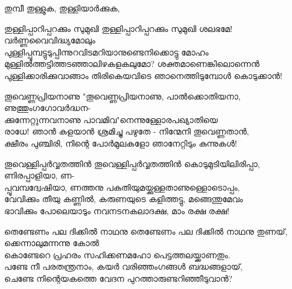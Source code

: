 \begin{enumerate}
\begin{slokam}{\VSv}{\KND}{തുമ്പീ തുള്ളുക, തുള്ളിയാർക്കുക,}
\end{slokam}


\begin{slokam}{\VSr}{\HM}{തുള്ളിപ്പാറിപ്പറക്കും സുമുഖി}
തുള്ളിപ്പാറിപ്പറക്കും സുമുഖി ശലഭമേ! വർണ്ണവൈവിദ്ധ്യമോലും\\
പുള്ളിപ്പൂമ്പട്ടുടുപ്പിന്നുറവിടമറിയാനുണ്ടെനിക്കൊട്ടു മോഹം\\
മുള്ളിൽത്തട്ടിത്തടഞ്ഞാലിഴകളകലുമോ? ശക്തമാണെങ്കിലൊന്നെൻ\\
പുള്ളിക്കാരിക്കുവാങ്ങാം തിരികെയവിടെ ഞാനെത്തിടുമ്പോൾ കൊടുക്കാൻ!
\end{slokam}




\begin{slokam}{\VSv}{\VKG}{തൂവെണ്ണപ്രിയനാണു}
"തൂവെണ്ണപ്രിയനാണു, പാൽക്കൊതിയനാ, ണുത്തുംഗഗോവർദ്ധന-\\
ക്കുന്നേറ്റുന്നവനാണു പാവമിവ"നെന്നുള്ളോരപഖ്യാതിയെ\\
രാധേ! ഞാൻ കളയാൻ ശ്രമിച്ചു പഴുതേ - നിന്മേനി തൂവെണ്ണതാൻ,\\
ക്ഷീരം പുഞ്ചിരി, നിന്റെ പോർമുലകളോ ഞാനേറ്റിടും കുന്നുകള്‍!
\end{slokam}




\begin{slokam}{\VSr}{\VKG}{തൂവെള്ളിപ്പർവ്വതത്തിൻ}
തൂവെള്ളിപ്പർവ്വതത്തിൻ കൊടുമുടിയിലിരിപ്പാ, ണിരപ്പാളിയാ, ണ-\\
പ്പൂവമ്പദ്വേഷിയാ, ണത്തനു പകുതിയുമയ്ക്കുള്ളതാണുള്ളൊടൊപ്പം,\\
വേവിക്കും തീയു കണ്ണിൽ, കരുണയുടെ കളിത്തട്ടു, മങ്ങെന്തുമേവം\\
ഭാവിക്കും പോലെയാടും നവനടനകലാദക്ഷ, മാം രക്ഷ രക്ഷ!
\end{slokam}


\begin{slokam}{\VSv}{\TMV}{തെണ്ടേണം പല ദിക്കിൽ നാഥനു}
തെണ്ടേണം പല ദിക്കിൽ നാഥനു തുണയ്‌, ക്കെന്നാലുമന്നന്നു കോൽ\\
കൊണ്ടേറെ പ്രഹരം സഹിക്കണമഹോ പെട്ടത്തലയ്ക്കാണതും.\\
പണ്ടേ നീ പരതന്ത്രനാം, കയർ വരിഞ്ഞംഗങ്ങള്‍ ബദ്ധങ്ങളായ്‌,\\
ചെണ്ടേ നിന്റെയകത്തെ വേദന പുറത്താരുണ്ടറിഞ്ഞീടുവാൻ?

\end{slokam}




\end{enumerate}
